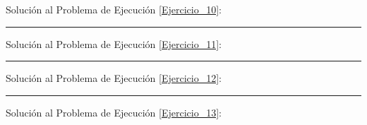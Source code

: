 \documentclass[12pt, letter]{exam}
\begin{document}
Solución al Problema de Ejecución \ref{Ejercicio_10}:

\vspace*{3.5cm}
\rule{0.9\textwidth}{0.3mm}

\newpage

Solución al Problema de Ejecución \ref{Ejercicio_11}:

\vspace*{3.5cm}
\rule{0.9\textwidth}{0.3mm}

Solución al Problema de Ejecución \ref{Ejercicio_12}:

\vspace*{3.5cm}
\rule{0.9\textwidth}{0.3mm}

Solución al Problema de Ejecución \ref{Ejercicio_13}:





\end{document}
